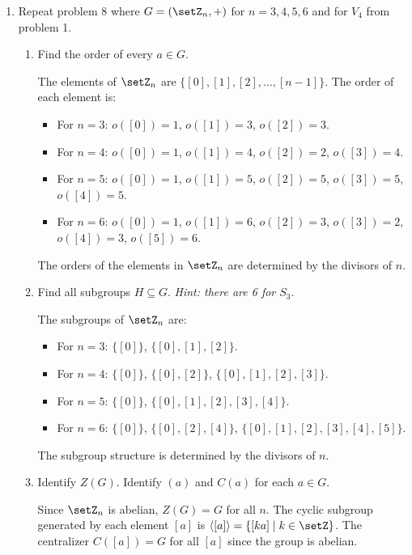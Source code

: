 \begin{enumerate}
  \newpage
  \item Repeat problem 8 where $G=\left(\setZ_n,+\right)$ for 
  $n=3,4,5,6$ and for $V_4$ from problem 1.
  \begin{enumerate}
    \item Find the order of every $a \in G$.
    \begin{subanswer}
      The elements of $\setZ_n$ are $\{[0], [1], [2], \ldots, [n-1]\}$. 
      The order of each element is:
      \begin{itemize}
        \item For $n=3$: $o([0])=1$, $o([1])=3$, $o([2])=3$.
        \item For $n=4$: $o([0])=1$, $o([1])=4$, $o([2])=2$, $o([3])=4$.
        \item For $n=5$: $o([0])=1$, $o([1])=5$, $o([2])=5$, $o([3])=5$, $o([4])=5$.
        \item For $n=6$: $o([0])=1$, $o([1])=6$, $o([2])=3$, $o([3])=2$, $o([4])=3$, $o([5])=6$.
      \end{itemize}
      The orders of the elements in $\setZ_n$ are determined by the divisors of $n$.
    \end{subanswer}
    \item Find all subgroups $H \subseteq G$. \textit{Hint: there are 6 for $S_3$}.
    \begin{subanswer}
      The subgroups of $\setZ_n$ are:
      \begin{itemize}
        \item For $n=3$: $\{[0]\}$, $\{[0], [1], [2]\}$.
        \item For $n=4$: $\{[0]\}$, $\{[0], [2]\}$, $\{[0], [1], [2], [3]\}$.
        \item For $n=5$: $\{[0]\}$, $\{[0], [1], [2], [3], [4]\}$.
        \item For $n=6$: $\{[0]\}$, $\{[0], [2], [4]\}$, $\{[0], [1], [2], [3], [4], [5]\}$.
      \end{itemize}
      The subgroup structure is determined by the divisors of $n$.
    \end{subanswer}
    \item Identify $Z(G)$. Identify $(a)$ and $C(a)$ for each $a \in G$.
    \begin{subanswer}
      Since $\setZ_n$ is abelian, $Z(G) = G$ for all $n$.
      The cyclic subgroup generated by each element $[a]$ is 
      $\langle [a] \rangle = \{[ka] \mid k \in \setZ\}$.
      The centralizer $C([a]) = G$ for all $[a]$ since the group is abelian.
    \end{subanswer}

\end{enumerate}
\end{enumerate}
